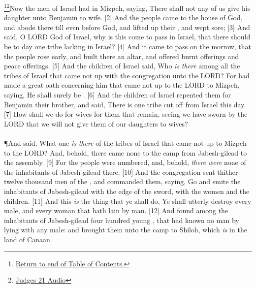 \footnote{\textcolor[cmyk]{0.99998,1,0,0}{\hyperlink{TOC}{Return to end of Table of Contents.}}}\footnote{\href{https://audiobible.com/bible/judges_21.html}{\textcolor[cmyk]{0.99998,1,0,0}{Judges 21 Audio}}}\textcolor[cmyk]{0.99998,1,0,0}{Now the men of Israel had  in Mizpeh, saying, There shall not any of us give his daughter unto Benjamin to wife.}
[2] \textcolor[cmyk]{0.99998,1,0,0}{And the people came to the house of God, and abode there till even before God, and lifted up their , and wept sore;}
[3] \textcolor[cmyk]{0.99998,1,0,0}{And said, O LORD God of Israel, why is this come to pass in Israel, that there should be to day one tribe lacking in Israel?}
[4] \textcolor[cmyk]{0.99998,1,0,0}{And it came to pass on the morrow, that the people rose early, and built there an altar, and offered burnt offerings and peace offerings.}
[5] \textcolor[cmyk]{0.99998,1,0,0}{And the children of Israel said, Who \emph{is} \emph{there} among all the tribes of Israel that came not up with the congregation unto the LORD? For  had made a great oath concerning him that came not up to the LORD to Mizpeh, saying, He shall surely be .}
[6] \textcolor[cmyk]{0.99998,1,0,0}{And the children of Israel repented them for Benjamin their brother, and said, There is one tribe cut off from Israel this day.}
[7] \textcolor[cmyk]{0.99998,1,0,0}{How shall we do for wives for them that remain, seeing we have sworn by the LORD that we will not give them of our daughters to wives?}\\
\\
\P \textcolor[cmyk]{0.99998,1,0,0}{And  said, What one \emph{is} \emph{there} of the tribes of Israel that came not up to Mizpeh to the LORD? And, behold, there came none to the camp from Jabesh-gilead to the assembly.}
[9] \textcolor[cmyk]{0.99998,1,0,0}{For the people were numbered, and, behold, \emph{there} \emph{were} none of the inhabitants of Jabesh-gilead there.}
[10] \textcolor[cmyk]{0.99998,1,0,0}{And the congregation sent thither twelve thousand men of the , and commanded them, saying, Go and smite the inhabitants of Jabesh-gilead with the edge of the sword, with the women and the children.}
[11] \textcolor[cmyk]{0.99998,1,0,0}{And this \emph{is} the thing that ye shall do, Ye shall utterly destroy every male, and every woman that hath lain by man.}
[12] \textcolor[cmyk]{0.99998,1,0,0}{And  found among the inhabitants of Jabesh-gilead four hundred young , that had known no man by lying with any male: and  brought them unto the camp to Shiloh, which \emph{is} in the land of Canaan.}
